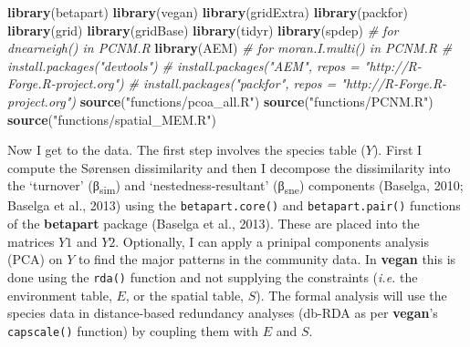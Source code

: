 \documentclass[10pt,A4,]{article}
\newenvironment{Shaded}{\begin{snugshade}}{\end{snugshade}}
\newcommand{\KeywordTok}[1]{\textcolor[rgb]{0.13,0.29,0.53}{\textbf{#1}}}
\newcommand{\StringTok}[1]{\textcolor[rgb]{0.31,0.60,0.02}{#1}}
\newcommand{\CommentTok}[1]{\textcolor[rgb]{0.56,0.35,0.01}{\textit{#1}}}
\newcommand{\NormalTok}[1]{#1}
\begin{document}
\begin{Shaded}
\begin{Highlighting}[]
\KeywordTok{library}\NormalTok{(betapart)}
\KeywordTok{library}\NormalTok{(vegan)}
\KeywordTok{library}\NormalTok{(gridExtra)}
\KeywordTok{library}\NormalTok{(packfor)}
\KeywordTok{library}\NormalTok{(grid)}
\KeywordTok{library}\NormalTok{(gridBase)}
\KeywordTok{library}\NormalTok{(tidyr)}
\KeywordTok{library}\NormalTok{(spdep) }\CommentTok{# for dnearneigh() in PCNM.R}
\KeywordTok{library}\NormalTok{(AEM) }\CommentTok{# for moran.I.multi() in PCNM.R}
\CommentTok{# install.packages("devtools")}
\CommentTok{# install.packages("AEM", repos = "http://R-Forge.R-project.org")}
\CommentTok{# install.packages("packfor", repos = "http://R-Forge.R-project.org")}
\KeywordTok{source}\NormalTok{(}\StringTok{"functions/pcoa_all.R"}\NormalTok{)}
\KeywordTok{source}\NormalTok{(}\StringTok{"functions/PCNM.R"}\NormalTok{)}
\KeywordTok{source}\NormalTok{(}\StringTok{"functions/spatial_MEM.R"}\NormalTok{)}
\end{Highlighting}
\end{Shaded}

Now I get to the data. The first step involves the species table
(\(Y\)). First I compute the Sørensen dissimilarity and then I decompose
the dissimilarity into the `turnover' (β\textsubscript{sim}) and
`nestedness-resultant' (β\textsubscript{sne}) components (Baselga, 2010;
Baselga et al., 2013) using the \texttt{betapart.core()} and
\texttt{betapart.pair()} functions of the \textbf{betapart} package
(Baselga et al., 2013). These are placed into the matrices \(Y1\) and
\(Y2\). Optionally, I can apply a prinipal components analysis (PCA) on
\(Y\) to find the major patterns in the community data. In
\textbf{vegan} this is done using the \texttt{rda()} function and not
supplying the constraints (\emph{i.e.} the environment table, \(E\), or
the spatial table, \(S\)). The formal analysis will use the species data
in distance-based redundancy analyses (db-RDA as per \textbf{vegan}'s
\texttt{capscale()} function) by coupling them with \(E\) and \(S\).
\end{document}
